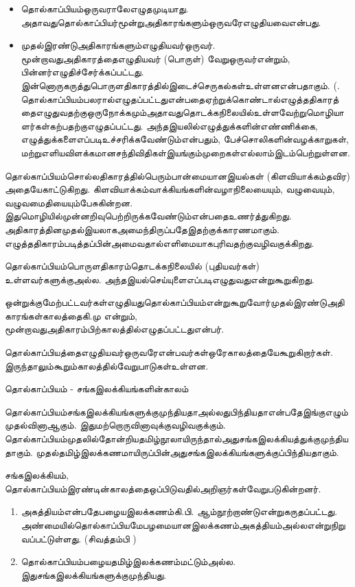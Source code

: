 \begin{itemize}
\item தொல்காப்பியம்ஒருவராலேஎழுதமுடியாது. அதாவதுதொல்காப்பியர்மூன்றுஅதிகாரங்களும்ஒருவரேஎழுதியவைஎன்பது.

 \item முதல்இரண்டுஅதிகாரங்களும்எழுதியவர்ஒருவர். மூன்றாவதுஅதிகாரத்தைஎழுதியவர் (பொருள்) வேறுஒருவர்என்றும், பின்னர்எழுதிச்சேர்க்கப்பட்டது. இன்னொருகருத்துபொருளதிகாரத்தில்இடைச்செருகல்கள்உள்ளனஎன்பதாகும். (. தொல்காப்பியம்பலரால்எழுதப்பட்டதுஎன்பதைஏற்றுக்கொண்டால்எழுத்ததிகாரத்தைஎழுதுவதற்குஒருநோக்கமும்அதாவதுதொடக்கநிலையில்உள்ளவேற்றுமொழியாளர்கள்கற்பதற்குஎழுதப்பட்டது. அந்தஇயலில்எழுத்துக்களின்எண்ணிக்கை, எழுத்துக்களைஎப்படிஉச்சரிக்கவேண்டும்என்பதும், பேச்சொலிகளின்வழக்காறுகள், மற்றுஎளியவிளக்கமானசந்திவிதிகள்இயங்கும்முறைகள்எல்லாம்இடம்பெற்றுள்ளன.

\end{itemize}

தொல்காப்பியம்சொல்லதிகாரத்தில்பெரும்பான்மையானஇயல்கள் (கிளவியாக்கம்தவிர) அதையேகாட்டுகிறது. கிளவியாக்கம்வாக்கியங்களின்வழாநிலையையும், வழுவையும், வழுவமைதியையும்பேசுகின்றன. இதுமொழியில்முன்னறிவுபெற்றிருக்கவேண்டும்என்பதைஉணர்த்துகிறது. அதிகாரத்தினமுதல்இயலாகஅமைந்திருப்பதேஇதற்குக்காரணமாகும். எழுத்ததிகாரம்படித்தப்பின்அமைவதால்எளிமையாகபுரிவதற்குவழிவகுக்கிறது.

தொல்காப்பியம்பொருளதிகாரம்தொடக்கநிலையில் (புதியவர்கள்) உள்ளவர்களுக்குஅல்ல. அந்தஇயல்செய்யுளைஎப்படிஎழுதுவதுஎன்றுகூறுகிறது.

ஒன்றுக்குமேற்பட்டவர்கள்எழுதியதுதொல்காப்பியம்என்றுகூறுவோர்முதல்இரண்டுஅதிகாரங்கள்காலத்தைகி.மு என்றும், மூன்றாவதுஅதிகாரம்பிற்காலத்தில்எழுதப்பட்டதுஎன்பர்.

தொல்காப்பியத்தைஎழுதியவர்ஒருவரேஎன்பவர்கள்ஒரேகாலத்தையேகூறுகிறார்கள். இருந்தாலும்கூறும்காலத்தில்வேறுபாடுகள்உள்ளன.

தொல்காப்பியம் - சங்கஇலக்கியங்களின்காலம்

தொல்காப்பியம்சங்கஇலக்கியங்களுக்குமுந்தியதாஅல்லதுபிந்தியதாஎன்பதேஇங்குஎழும்முதல்வினாஆகும். இதுமற்றொருவினாவுக்குவழிவகுக்கும். தொல்காப்பியம்முதலில்தோன்றியதமிழ்நூலாயிருந்தால்அதுசங்கஇலக்கியத்துக்குமுந்தியதாகும். முதல்தமிழ்இலக்கணமாயிருப்பின்அதுசங்கஇலக்கியங்களுக்குப்பிந்தியதாகும். 

சங்கஇலக்கியம், தொல்காப்பியம்இரண்டின்காலத்தைஒப்பிடுவதில்அறிஞர்கள்வேறுபடுகின்றனர்.

\begin{enumerate}
\item அகத்தியம்என்பதேபழையஇலக்கணம்கி.பி. ஆம்நூற்றாண்டுஎன்றுகருதப்பட்டது. அண்மையில்தொல்காப்பியமேபழமையானஇலக்கணம்அகத்தியம்அல்லஎன்றுநிறுவப்பட்டுள்ளது. (சிவத்தம்பி )

 \item தொல்காப்பியம்பழையதமிழ்இலக்கணம்மட்டும்அல்ல. இதுசங்கஇலக்கியங்களுக்குமுந்தியது.

\end{enumerate}

